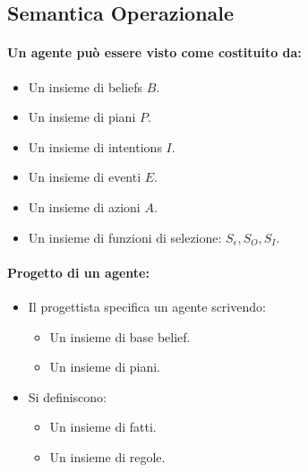 

\subsection{Semantica Operazionale}

\paragraph{Un agente può essere visto come costituito da:}

\begin{itemize}
  \item Un insieme di beliefs $B$. 
  \item Un insieme di piani $P$. 
  \item Un insieme di intentions $I$. 
  \item Un insieme di eventi $E$. 
  \item Un insieme di azioni $A$. 
  \item Un insieme di funzioni di selezione: $S_\epsilon, S_O, S_I$.
\end{itemize}

\paragraph{Progetto di un agente:}

\begin{itemize}
  \item Il progettista specifica un agente scrivendo:
    \begin{itemize}
      \item Un insieme di base belief. 
      \item Un insieme di piani.
    \end{itemize}
  \item Si definiscono:
    \begin{itemize}
      \item Un insieme di fatti. 
      \item Un insieme di regole.
    \end{itemize}
\end{itemize}

